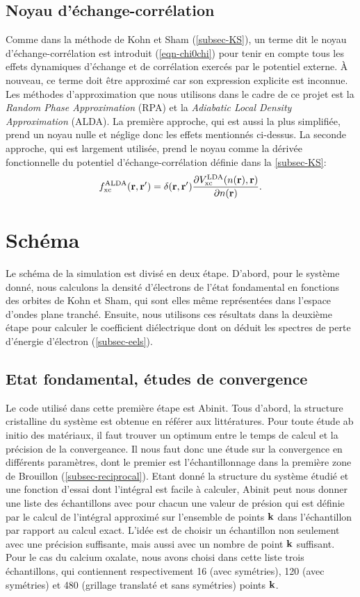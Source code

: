 \subsection{Noyau d'échange-corrélation}
Comme dans la méthode de Kohn et Sham (\cref{subsec-KS}),
un terme dit le noyau d'échange-corrélation est introduit (\cref{eqn-chi0chi})
pour tenir en compte tous les effets dynamiques d'échange et de corrélation
exercés par le potentiel externe.
À nouveau, ce terme doit être approximé car son expression explicite est inconnue.
Les méthodes d'approximation que nous utilisons dans le cadre de ce projet est
la \textit{Random Phase Approximation} (RPA) et
la \textit{Adiabatic Local Density Approximation} (ALDA).
La première approche, qui est aussi la plus simplifiée, prend un noyau nulle et
néglige donc les effets mentionnés ci-dessus.
La seconde approche, qui est largement utilisée,
prend le noyau comme la dérivée fonctionnelle du potentiel d'échange-corrélation
définie dans la \cref{subsec-KS}:
\begin{equation*}
  f_{\textnormal{xc}}^{\textnormal{ALDA}}(\vb{r}, \vb{r}')
  = \delta(\vb{r}, \vb{r}')\pdv{V_{\textnormal{xc}}^{\textnormal{LDA}}(n(\vb{r}), \vb{r})}{n(\vb{r})}.
\end{equation*}

\section{Schéma}
Le schéma de la simulation est divisé en deux étape.
D'abord, pour le système donné, nous calculons la densité d'électrons de l'état fondamental
en fonctions des orbites de Kohn et Sham,
qui sont elles même représentées dans l'espace d'ondes plane tranché.
Ensuite, nous utilisons ces résultats dans la deuxième étape pour calculer le coefficient
diélectrique dont on déduit les spectres de perte d'énergie d'électron (\cref{subsec-eels}).
\subsection{Etat fondamental, études de convergence}
Le code utilisé dans cette première étape est Abinit.
Tous d'abord, la structure cristalline du système est obtenue en référer aux littératures. %
Pour toute étude ab initio des matériaux,
il faut trouver un optimum entre le temps de calcul et la précision de la convergeance.
Il nous faut donc une étude sur la convergence en différents paramètres,
dont le premier est l'échantillonnage dans la première zone de Brouillon (\cref{subsec-reciprocal}).
Etant donné la structure du système étudié et une fonction d'essai dont l'intégral est facile à calculer,
Abinit peut nous donner une liste des échantillons avec pour chacun une valeur de présion
qui est définie par le calcul de l'intégral approximé sur l'ensemble de points $\vb{k}$ dans l'échantillon
par rapport au calcul exact.
L'idée est de choisir un échantillon non seulement avec une précision suffisante,
mais aussi avec un nombre de point $\vb{k}$ suffisant.
Pour le cas du calcium oxalate, nous avons choisi dans cette liste trois échantillons,
qui contiennent respectivement 16 (avec symétries),
120 (avec symétries) et 480 (grillage translaté et sans symétries) points $\vb{k}$.

